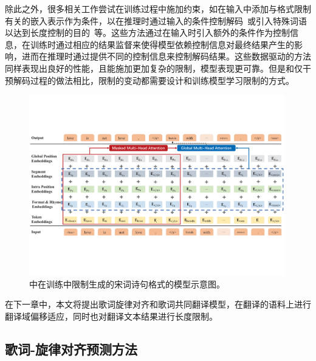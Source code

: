 除此之外，很多相关工作尝试在训练过程中施加约束，如在输入中添加与格式限制有关的嵌入表示作为条件，以在推理时通过输入的条件控制解码~\citep{li-etal-2020-rigid}或引入特殊词语以达到长度控制的目的~\citep{lakew-etal-2019-controlling,saboo-baumann-2019-integration}等。这些方法通过在输入时引入额外的条件作为控制信息，在训练时通过相应的结果监督来使得模型依赖控制信息对最终结果产生的影响，进而在推理时通过提供不同的控制信息来控制解码结果。这些数据驱动的方法同样表现出良好的性能，且能施加更加复杂的限制，模型表现更可靠。但是和仅干预解码过程的做法相比，限制的变动都需要设计和训练模型学习限制的方式。
\begin{figure}[!h]
  \includegraphics[width=0.99\textwidth]{figure/related/train_constrain.pdf}
  \caption{\citet{li-etal-2020-rigid}中在训练中限制生成的宋词诗句格式的模型示意图。}
\end{figure}

在下一章中，本文将提出歌词旋律对齐和歌词共同翻译模型，在翻译的语料上进行翻译域偏移适应，同时也对翻译文本结果进行长度限制。
\subsection{歌词-旋律对齐预测方法}
